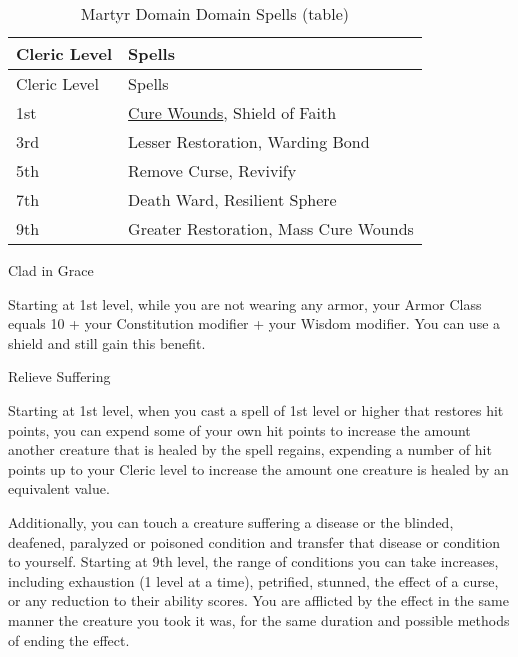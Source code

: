 \begin{longtable}[]{@{}
  >{\raggedright\arraybackslash}p{}
  >{\raggedright\arraybackslash}p{}@{}}
\caption{Martyr Domain Domain Spells
(table)}\label{cleric-domain-martry-spells-table}\tabularnewline
\toprule\noalign{}
\begin{minipage}[b]{\linewidth}\raggedright
Cleric Level
\end{minipage} & \begin{minipage}[b]{\linewidth}\raggedright
Spells
\end{minipage} \\
\midrule\noalign{}
\endfirsthead
\toprule\noalign{}
\begin{minipage}[b]{\linewidth}\raggedright
Cleric Level
\end{minipage} & \begin{minipage}[b]{\linewidth}\raggedright
Spells
\end{minipage} \\
\midrule\noalign{}
\endhead
\bottomrule\noalign{}
\endlastfoot
1st & \hyperref[spell-cure-wounds]{Cure Wounds}, Shield of Faith \\
3rd & Lesser Restoration, Warding Bond \\
5th & Remove Curse, Revivify \\
7th & Death Ward, Resilient Sphere \\
9th & Greater Restoration, Mass Cure Wounds \\
\end{longtable}

Clad in Grace

Starting at 1st level, while you are not wearing any armor, your Armor
Class equals 10 + your Constitution modifier + your Wisdom modifier. You
can use a shield and still gain this benefit.

Relieve Suffering

Starting at 1st level, when you cast a spell of 1st level or higher that
restores hit points, you can expend some of your own hit points to
increase the amount another creature that is healed by the spell
regains, expending a number of hit points up to your Cleric level to
increase the amount one creature is healed by an equivalent value.

Additionally, you can touch a creature suffering a disease or the
blinded, deafened, paralyzed or poisoned condition and transfer that
disease or condition to yourself. Starting at 9th level, the range of
conditions you can take increases, including exhaustion (1 level at a
time), petrified, stunned, the effect of a curse, or any reduction to
their ability scores. You are afflicted by the effect in the same manner
the creature you took it was, for the same duration and possible methods
of ending the effect.

